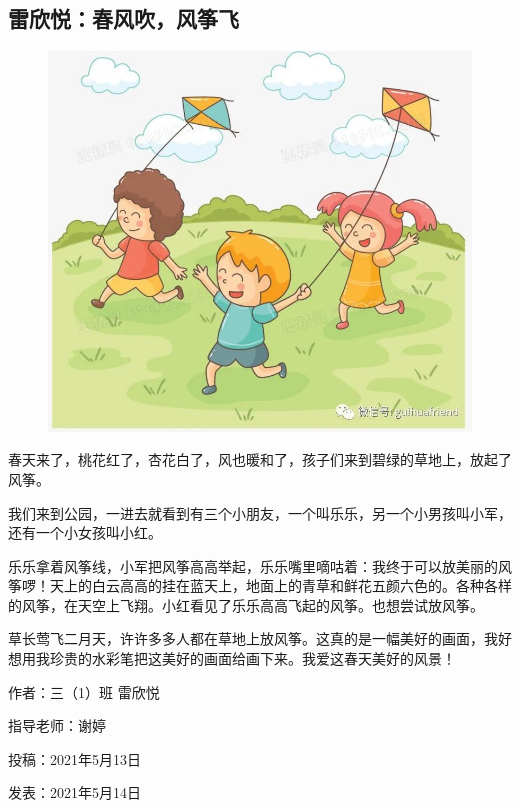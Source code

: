 \vspace{10pt}

{\centering\subsection*{雷欣悦：春风吹，风筝飞}}


\renewcommand{\leftmark}{雷欣悦：春风吹，风筝飞}

\begin{figure}[htbp]

\centering

\includegraphics[width = .5\textwidth]{./ch/24.jpg}

\end{figure}





春天来了，桃花红了，杏花白了，风也暖和了，孩子们来到碧绿的草地上，放起了风筝。

我们来到公园，一进去就看到有三个小朋友，一个叫乐乐，另一个小男孩叫小军，还有一个小女孩叫小红。

乐乐拿着风筝线，小军把风筝高高举起，乐乐嘴里嘀咕着：我终于可以放美丽的风筝啰！天上的白云高高的挂在蓝天上，地面上的青草和鲜花五颜六色的。各种各样的风筝，在天空上飞翔。小红看见了乐乐高高飞起的风筝。也想尝试放风筝。

草长莺飞二月天，许许多多人都在草地上放风筝。这真的是一幅美好的画面，我好想用我珍贵的水彩笔把这美好的画面给画下来。我爱这春天美好的风景！





\vspace{10pt}



作者：三（1）班 雷欣悦



指导老师：谢婷



投稿：2021年5月13日



发表：2021年5月14日










                



\vspace{10pt}

\hline



